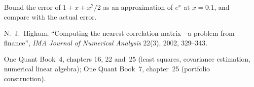 \begin{interviewq}\label{iq:iv:linear-algebra-and-calculus:13}
Bound the error of $1 + x + x^2/2$ as an approximation of $e^x$ at $x = 0.1$, and compare with the actual error.
\end{interviewq}

\begin{omsources}
\item N.~J.~Higham, ``Computing the nearest correlation matrix---a problem from finance'', \emph{IMA Journal of
Numerical Analysis} 22(3), 2002, 329--343.
\item One Quant Book~4, chapters 16, 22 and~25 (least squares, covariance estimation, numerical linear algebra); One
Quant Book~7, chapter~25 (portfolio construction).
\end{omsources}

